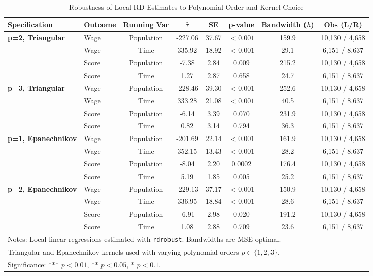 \documentclass{article}
\begin{document}
\begin{table}[H]
\centering
\caption{Robustness of Local RD Estimates to Polynomial Order and Kernel Choice}
\label{tab:rd_robustness}
\begin{tabular}{llcccccc}
\hline
Specification & Outcome & Running Var & $\hat{\tau}$ & SE & p-value & Bandwidth ($h$) & Obs (L/R) \\
\hline
\textbf{p=2, Triangular} & Wage & Population & -227.06 & 37.67 & $<0.001$ & 159.9 & 10,130 / 4,658 \\
                         & Wage & Time       & 335.92  & 18.92 & $<0.001$ & 29.1  & 6,151 / 8,637 \\
                         & Score & Population & -7.38  & 2.84 & 0.009 & 215.2 & 10,130 / 4,658 \\
                         & Score & Time       & 1.27   & 2.87 & 0.658 & 24.7 & 6,151 / 8,637 \\
\textbf{p=3, Triangular} & Wage & Population & -228.46 & 39.30 & $<0.001$ & 252.6 & 10,130 / 4,658 \\
                         & Wage & Time       & 333.28  & 21.08 & $<0.001$ & 40.5  & 6,151 / 8,637 \\
                         & Score & Population & -6.14  & 3.39 & 0.070 & 231.9 & 10,130 / 4,658 \\
                         & Score & Time       & 0.82   & 3.14 & 0.794 & 36.3 & 6,151 / 8,637 \\
\textbf{p=1, Epanechnikov} & Wage & Population & -201.69 & 22.14 & $<0.001$ & 161.9 & 10,130 / 4,658 \\
                           & Wage & Time       & 352.15  & 13.43 & $<0.001$ & 28.2  & 6,151 / 8,637 \\
                           & Score & Population & -8.04  & 2.20 & 0.0002 & 176.4 & 10,130 / 4,658 \\
                           & Score & Time       & 5.19   & 1.85 & 0.005 & 25.2 & 6,151 / 8,637 \\
\textbf{p=2, Epanechnikov} & Wage & Population & -229.13 & 37.17 & $<0.001$ & 150.9 & 10,130 / 4,658 \\
                           & Wage & Time       & 336.95  & 18.84 & $<0.001$ & 28.6  & 6,151 / 8,637 \\
                           & Score & Population & -6.91  & 2.98 & 0.020 & 191.2 & 10,130 / 4,658 \\
                           & Score & Time       & 1.08   & 2.88 & 0.709 & 23.6 & 6,151 / 8,637 \\
\hline
\multicolumn{8}{l}{\footnotesize Notes: Local linear regressions estimated with \texttt{rdrobust}. Bandwidths are MSE-optimal.}\\
\multicolumn{8}{l}{\footnotesize Triangular and Epanechnikov kernels used with varying polynomial orders $p \in \{1,2,3\}$.}\\
\multicolumn{8}{l}{\footnotesize Significance: *** $p<0.01$, ** $p<0.05$, * $p<0.1$.}\\
\end{tabular}
\end{table}
\end{document}
